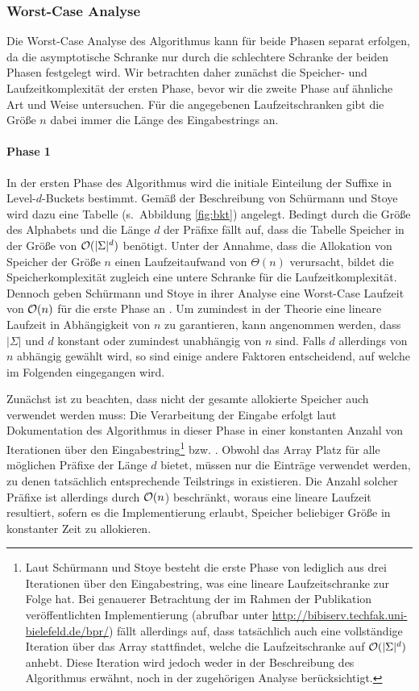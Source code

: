 \subsubsection{Worst-Case Analyse}
\label{bpr:effizienz:theorie}

Die Worst-Case Analyse des Algorithmus kann für beide Phasen separat erfolgen, da die asymptotische Schranke nur durch die schlechtere Schranke der beiden Phasen festgelegt wird. Wir betrachten daher zunächst die Speicher- und Laufzeitkomplexität der ersten Phase, bevor wir die zweite Phase auf ähnliche Art und Weise untersuchen. Für die angegebenen Laufzeitschranken gibt die Größe \(n\) dabei immer die Länge des Eingabestrings an.
\paragraph*{Phase 1}
In der ersten Phase des Algorithmus wird die initiale Einteilung der Suffixe in Level-\(d\)-Buckets bestimmt. Gemäß der Beschreibung von Schürmann und Stoye wird dazu eine Tabelle \bkt (s.~Abbildung \ref{fig:bkt}) angelegt. Bedingt durch die Größe des Alphabets und die Länge \(d\) der Präfixe fällt auf, dass die Tabelle Speicher in der Größe von \(\mathcal{O}(|\Sigma|^d)\) benötigt. Unter der Annahme, dass die Allokation von Speicher der Größe \(n\) einen Laufzeitaufwand von \(\Theta(n)\) verursacht, bildet die Speicherkomplexität zugleich eine untere Schranke für die Laufzeitkomplexität. Dennoch geben Schürmann und Stoye in ihrer Analyse eine Worst-Case Laufzeit von \(\mathcal{O}(n)\) für die erste Phase an \cite[Kapitel 3.2]{schuermann2005}. Um zumindest in der Theorie eine lineare Laufzeit in Abhängigkeit von \(n\) zu garantieren, kann angenommen werden, dass \(|\Sigma|\) und \(d\) konstant oder zumindest unabhängig von \(n\) sind. Falls \(d\) allerdings von \(n\) abhängig gewählt wird, so sind einige andere Faktoren entscheidend, auf welche im Folgenden eingegangen wird.\par
Zunächst ist zu beachten, dass nicht der gesamte allokierte Speicher auch verwendet werden muss: Die Verarbeitung der Eingabe erfolgt laut Dokumentation des Algorithmus in dieser Phase in einer konstanten Anzahl von Iterationen über den Eingabestring\footnote{Laut Schürmann und Stoye \cite[Kapitel~3.3]{schuermann2005} besteht die erste Phase von \bpr lediglich aus drei Iterationen über den Eingabestring, was eine lineare Laufzeitschranke zur Folge hat. Bei genauerer Betrachtung der im Rahmen der Publikation veröffentlichten Implementierung (abrufbar unter \url{http://bibiserv.techfak.uni-bielefeld.de/bpr/}) fällt allerdings auf, dass tatsächlich auch eine vollständige Iteration über das Array \bkt stattfindet, welche die Laufzeitschranke auf \(\mathcal{O}(|\Sigma|^d)\) anhebt. Diese Iteration wird jedoch weder in der Beschreibung des Algorithmus erwähnt, noch in der zugehörigen Analyse berücksichtigt.}  bzw. . Obwohl das Array \bkt Platz für alle möglichen Präfixe der Länge \(d\) bietet, müssen nur die Einträge verwendet werden, zu denen tatsächlich entsprechende Teilstrings in  existieren. Die Anzahl solcher Präfixe ist allerdings durch \(\mathcal{O}(n\)) beschränkt, woraus eine lineare Laufzeit resultiert, sofern es die Implementierung erlaubt, Speicher beliebiger Größe in konstanter Zeit zu allokieren.\par
